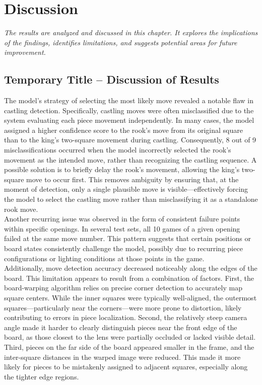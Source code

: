 \chapter{Discussion}

\begin{center}
    \textit{The results are analyzed and discussed in this chapter. It explores the implications of the findings, identifies limitations, and suggests potential areas for future improvement.}
\end{center}

\section{Temporary Title – Discussion of Results}

The model’s strategy of selecting the most likely move revealed a notable flaw in castling detection. Specifically, castling moves were often misclassified due to the system evaluating each piece movement independently. In many cases, the model assigned a higher confidence score to the rook's move from its original square than to the king’s two-square movement during castling. Consequently, 8 out of 9 misclassifications occurred when the model incorrectly selected the rook’s movement as the intended move, rather than recognizing the castling sequence. A possible solution is to briefly delay the rook’s movement, allowing the king’s two-square move to occur first. This removes ambiguity by ensuring that, at the moment of detection, only a single plausible move is visible—effectively forcing the model to select the castling move rather than misclassifying it as a standalone rook move. \\

Another recurring issue was observed in the form of consistent failure points within specific openings. In several test sets, all 10 games of a given opening failed at the same move number. This pattern suggests that certain positions or board states consistently challenge the model, possibly due to recurring piece configurations or lighting conditions at those points in the game. \\

Additionally, move detection accuracy decreased noticeably along the edges of the board. This limitation appears to result from a combination of factors. First, the board-warping algorithm relies on precise corner detection to accurately map square centers. While the inner squares were typically well-aligned, the outermost squares—particularly near the corners—were more prone to distortion, likely contributing to errors in piece localization. Second, the relatively steep camera angle made it harder to clearly distinguish pieces near the front edge of the board, as those closest to the lens were partially occluded or lacked visible detail. Third, pieces on the far side of the board appeared smaller in the frame, and the inter-square distances in the warped image were reduced. This made it more likely for pieces to be mistakenly assigned to adjacent squares, especially along the tighter edge regions. \\

